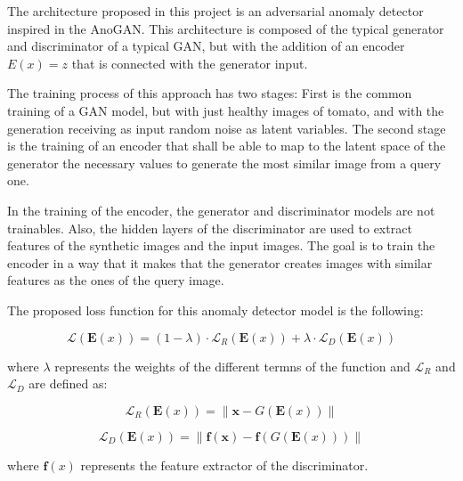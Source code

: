 The architecture proposed in this project is an adversarial anomaly detector inspired in the AnoGAN. This architecture is composed of the typical generator and discriminator of a typical GAN, but with the addition of an encoder \begin{math}E(x) = z\end{math} that is connected with the generator input.

The training process of this approach has two stages: First is the common training of a GAN model, but with just healthy images of tomato, and with the generation receiving as input random noise as latent variables. The second stage is the training of an encoder that shall be able to map to the latent space of the generator the necessary values to generate the most similar image from a query one.

In the training of the encoder, the generator and discriminator models are not trainables. Also, the hidden layers of the discriminator are used to extract features of the synthetic images and the input images. The goal is to train the encoder in a way that it makes that the generator creates images with similar features as the ones of the query image.

The proposed loss function for this anomaly detector model is the following:

\begin{equation}
 \mathcal{L}\left(\mathbf{E}(x)\right)=(1-\lambda) \cdot \mathcal{L}_{R}\left(\mathbf{E}(x)\right)+\lambda \cdot \mathcal{L}_{D}\left(\mathbf{E}(x)\right)
\end{equation}

where \begin{math}\lambda\end{math} represents the weights of the different termns of the function and \begin{math}\mathcal{L}_{R}\end{math} and \begin{math}\mathcal{L}_{D}\end{math} are defined as:

\begin{equation}
 \mathcal{L}_{R}\left(\mathbf{E}(x)\right)=\left\|\mathbf{x}-G\left(\mathbf{E}(x)\right)\right\|
\end{equation}

\begin{equation}
 \mathcal{L}_{D}\left(\mathbf{E}(x)\right)=\left\|\mathbf{f}(\mathbf{x})-\mathbf{f}\left(G\left(\mathbf{E}(x)\right)\right)\right\|
\end{equation}

where \begin{math}\mathbf{f}(x)\end{math} represents the feature extractor of the discriminator.

